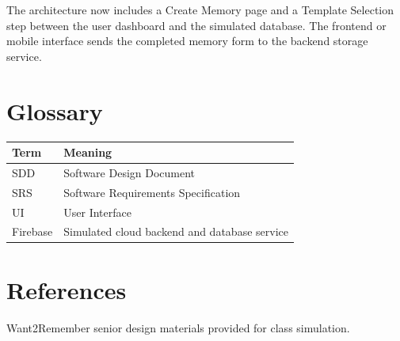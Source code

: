 \documentclass{article}
\begin{document}
The architecture now includes a Create Memory page and a Template Selection step between the user dashboard and the simulated database. The frontend or mobile interface sends the completed memory form to the backend storage service.

\section{Glossary}
\begin{longtable}{|p{3cm}|p{10cm}|}
\hline
Term & Meaning \\ \hline
SDD & Software Design Document \\ \hline
SRS & Software Requirements Specification \\ \hline
UI & User Interface \\ \hline
Firebase & Simulated cloud backend and database service \\ \hline
\end{longtable}

\section{References}
Want2Remember senior design materials provided for class simulation.
\end{document}
